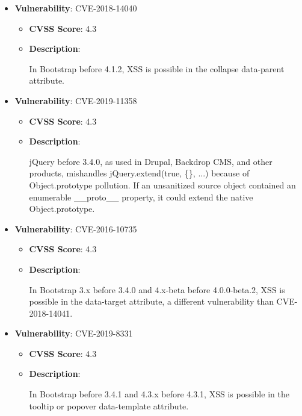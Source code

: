 \documentclass{article}
\begin{document}
\begin{itemize}
    
        \item \textbf{Vulnerability}: CVE-2018-14040
        \begin{itemize}
            \item \textbf{CVSS Score}:  4.3 
            \item \textbf{Description}:
            \parbox[t]{0.9\linewidth}{
                \ttfamily In Bootstrap before 4.1.2, XSS is possible in the collapse data-parent attribute.
            }
        \end{itemize}
    
        \item \textbf{Vulnerability}: CVE-2019-11358
        \begin{itemize}
            \item \textbf{CVSS Score}:  4.3 
            \item \textbf{Description}:
            \parbox[t]{0.9\linewidth}{
                \ttfamily jQuery before 3.4.0, as used in Drupal, Backdrop CMS, and other products, mishandles jQuery.extend(true, \{\}, ...) because of Object.prototype pollution. If an unsanitized source object contained an enumerable \_\_proto\_\_ property, it could extend the native Object.prototype.
            }
        \end{itemize}
    
        \item \textbf{Vulnerability}: CVE-2016-10735
        \begin{itemize}
            \item \textbf{CVSS Score}:  4.3 
            \item \textbf{Description}:
            \parbox[t]{0.9\linewidth}{
                \ttfamily In Bootstrap 3.x before 3.4.0 and 4.x-beta before 4.0.0-beta.2, XSS is possible in the data-target attribute, a different vulnerability than CVE-2018-14041.
            }
        \end{itemize}
    
        \item \textbf{Vulnerability}: CVE-2019-8331
        \begin{itemize}
            \item \textbf{CVSS Score}:  4.3 
            \item \textbf{Description}:
            \parbox[t]{0.9\linewidth}{
                \ttfamily In Bootstrap before 3.4.1 and 4.3.x before 4.3.1, XSS is possible in the tooltip or popover data-template attribute.
            }
        \end{itemize}
    

\end{itemize}
\end{document}
